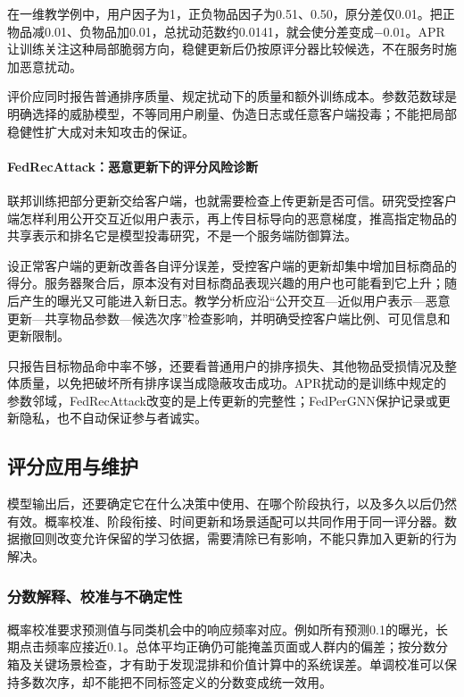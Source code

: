 在一维教学例中，用户因子为1，正负物品因子为0.51、0.50，原分差仅0.01。把正物品减0.01、负物品加0.01，总扰动范数约0.0141，就会使分差变成$-0.01$。APR让训练关注这种局部脆弱方向，稳健更新后仍按原评分器比较候选，不在服务时施加恶意扰动。

评价应同时报告普通排序质量、规定扰动下的质量和额外训练成本。参数范数球是明确选择的威胁模型，不等同用户刷量、伪造日志或任意客户端投毒；不能把局部稳健性扩大成对未知攻击的保证。

\paragraph{FedRecAttack：恶意更新下的评分风险诊断}
\label{sec:rs-fedrecattack}

联邦训练把部分更新交给客户端，也就需要检查上传更新是否可信。研究受控客户端怎样利用公开交互近似用户表示，再上传目标导向的恶意梯度，推高指定物品的共享表示和排名它是模型投毒研究，不是一个服务端防御算法。

设正常客户端的更新改善各自评分误差，受控客户端的更新却集中增加目标商品的得分。服务器聚合后，原本没有对目标商品表现兴趣的用户也可能看到它上升；随后产生的曝光又可能进入新日志。教学分析应沿“公开交互—近似用户表示—恶意更新—共享物品参数—候选次序”检查影响，并明确受控客户端比例、可见信息和更新限制。

只报告目标物品命中率不够，还要看普通用户的排序损失、其他物品受损情况及整体质量，以免把破坏所有排序误当成隐蔽攻击成功。APR扰动的是训练中规定的参数邻域，FedRecAttack改变的是上传更新的完整性；FedPerGNN保护记录或更新隐私，也不自动保证参与者诚实。

\subsection{评分应用与维护}
\label{sec:rs-scoring-maintenance}

模型输出后，还要确定它在什么决策中使用、在哪个阶段执行，以及多久以后仍然有效。概率校准、阶段衔接、时间更新和场景适配可以共同作用于同一评分器。数据撤回则改变允许保留的学习依据，需要清除已有影响，不能只靠加入更新的行为解决。

\subsubsection{分数解释、校准与不确定性}
\label{sec:rs-score-calibration}

概率校准要求预测值与同类机会中的响应频率对应。例如所有预测0.1的曝光，长期点击频率应接近0.1。总体平均正确仍可能掩盖页面或人群内的偏差；按分数分箱及关键场景检查，才有助于发现混排和价值计算中的系统误差。单调校准可以保持多数次序，却不能把不同标签定义的分数变成统一效用。


